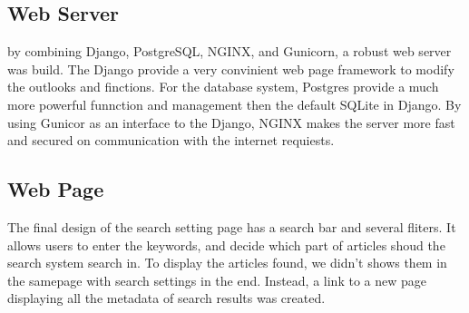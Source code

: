 \subsection{Web Server}
by combining Django, PostgreSQL, NGINX, and Gunicorn, a robust web server was build.
The Django provide a very convinient web page framework to modify the outlooks and finctions. 
For the database system, Postgres provide a much more powerful funnction and management then the default SQLite in Django.
By using Gunicor as an interface to the Django, NGINX makes the server more  fast and secured on communication with the internet requiests.
\subsection{Web Page}
The final design of the search setting page has a search bar and several fliters.
It allows users to enter the keywords, and decide which part of articles shoud the search system search in.
To display the articles found, we didn't shows them in the samepage with search settings in the end. Instead, a link to a new page displaying all the metadata of search results was created.
